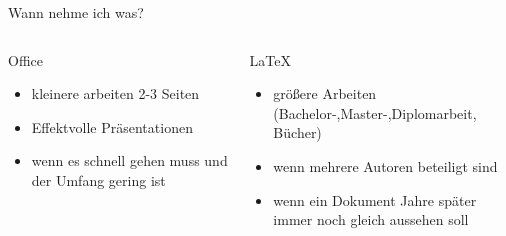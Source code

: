 \begin{frame}{Wann nehme ich was?}
	\begin{columns}
	\centering
		\begin{column}{0.45\textwidth}
			Office
			\begin{itemize}[<+->]
			\item kleinere arbeiten 2-3 Seiten
			\item Effektvolle Präsentationen
			\item wenn es schnell gehen muss und der Umfang gering ist
			\end{itemize}
		\end{column}
		\begin{column}{0.45\textwidth}
			\LaTeX
			\begin{itemize}[<+->]
			\item größere Arbeiten (Bachelor-,Master-,Diplomarbeit, Bücher)
			\item wenn mehrere Autoren beteiligt sind
			\item wenn ein Dokument Jahre später immer noch gleich aussehen soll
			\end{itemize}
		\end{column}
	\end{columns}
\end{frame}

